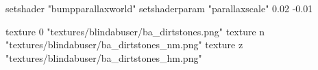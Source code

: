 	setshader "bumpparallaxworld"
	setshaderparam "parallaxscale" 0.02 -0.01

		texture 0 "textures/blindabuser/ba_dirtstones.png"
		texture n "textures/blindabuser/ba_dirtstones_nm.png"
		texture z "textures/blindabuser/ba_dirtstones_hm.png"
